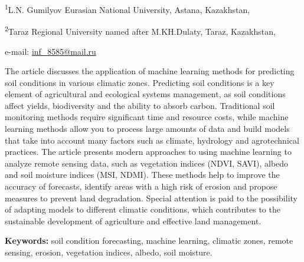 \begin{affiliation}
\textsuperscript{1}L.N. Gumilyov Eurasian National University, Astana, Kazakhstan,

\textsuperscript{2}Taraz Regional University named after M.KH.Dulaty, Taraz, Kazakhstan,

e-mail: \href{mailto:inf\_8585@mail.ru}{inf\_8585@mail.ru}
\end{affiliation}

The article discusses the application of machine learning methods for
predicting soil conditions in various climatic zones. Predicting soil
conditions is a key element of agricultural and ecological systems
management, as soil conditions affect yields, biodiversity and the
ability to absorb carbon. Traditional soil monitoring methods require
significant time and resource costs, while machine learning methods
allow you to process large amounts of data and build models that take
into account many factors such as climate, hydrology and agrotechnical
practices. The article presents modern approaches to using machine
learning to analyze remote sensing data, such as vegetation indices
(NDVI, SAVI), albedo and soil moisture indices (MSI, NDMI). These
methods help to improve the accuracy of forecasts, identify areas with a
high risk of erosion and propose measures to prevent land degradation.
Special attention is paid to the possibility of adapting models to
different climatic conditions, which contributes to the sustainable
development of agriculture and effective land management.

{\bfseries Keywords:} soil condition forecasting, machine learning,
climatic zones, remote sensing, erosion, vegetation indices, albedo,
soil moisture.

